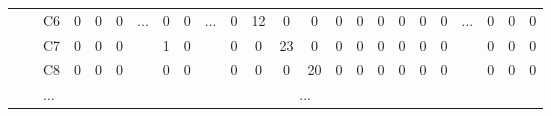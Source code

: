 \documentclass[12pt]{article}
\begin{document}
\begin{table}[!ht]
{\begin{tabular}{clcccccccccccccccccccccc}
								   & \multicolumn{1}{l|}{}                   & \multicolumn{1}{c|}{C6}   & \multicolumn{1}{c|}{0}    & \multicolumn{1}{c|}{0}    & \multicolumn{1}{c|}{0}    & \multicolumn{1}{c|}{\multirow{3}{*}{...}} & \multicolumn{1}{c|}{0}    & \multicolumn{1}{c|}{0}  & \multicolumn{1}{c|}{\multirow{3}{*}{...}} & \multicolumn{1}{c|}{0}  & \multicolumn{1}{c|}{12} & \multicolumn{1}{c|}{0}  & \multicolumn{1}{c|}{0}  & \multicolumn{1}{c|}{0}    & \multicolumn{1}{c|}{0}    & \multicolumn{1}{c|}{0}    & \multicolumn{1}{c|}{0}    & \multicolumn{1}{c|}{0}    & \multicolumn{1}{c|}{0}    & \multicolumn{1}{c|}{\multirow{3}{*}{...}} & \multicolumn{1}{c|}{0}  & \multicolumn{1}{c|}{0}  & \multicolumn{1}{c|}{0}  \\ \cline{3-6} \cline{8-9} \cline{11-20} \cline{22-24} 
								   & \multicolumn{1}{l|}{}                   & \multicolumn{1}{c|}{C7}   & \multicolumn{1}{c|}{0}    & \multicolumn{1}{c|}{0}    & \multicolumn{1}{c|}{0}    & \multicolumn{1}{c|}{}                     & \multicolumn{1}{c|}{1}    & \multicolumn{1}{c|}{0}  & \multicolumn{1}{c|}{}                     & \multicolumn{1}{c|}{0}  & \multicolumn{1}{c|}{0}  & \multicolumn{1}{c|}{23} & \multicolumn{1}{c|}{0}  & \multicolumn{1}{c|}{0}    & \multicolumn{1}{c|}{0}    & \multicolumn{1}{c|}{0}    & \multicolumn{1}{c|}{0}    & \multicolumn{1}{c|}{0}    & \multicolumn{1}{c|}{0}    & \multicolumn{1}{c|}{}                     & \multicolumn{1}{c|}{0}  & \multicolumn{1}{c|}{0}  & \multicolumn{1}{c|}{0}  \\ \cline{3-6} \cline{8-9} \cline{11-20} \cline{22-24} 
								   & \multicolumn{1}{l|}{}                   & \multicolumn{1}{c|}{C8}   & \multicolumn{1}{c|}{0}    & \multicolumn{1}{c|}{0}    & \multicolumn{1}{c|}{0}    & \multicolumn{1}{c|}{}                     & \multicolumn{1}{c|}{0}    & \multicolumn{1}{c|}{0}  & \multicolumn{1}{c|}{}                     & \multicolumn{1}{c|}{0}  & \multicolumn{1}{c|}{0}  & \multicolumn{1}{c|}{0}  & \multicolumn{1}{c|}{20} & \multicolumn{1}{c|}{0}    & \multicolumn{1}{c|}{0}    & \multicolumn{1}{c|}{0}    & \multicolumn{1}{c|}{0}    & \multicolumn{1}{c|}{0}    & \multicolumn{1}{c|}{0}    & \multicolumn{1}{c|}{}                     & \multicolumn{1}{c|}{0}  & \multicolumn{1}{c|}{0}  & \multicolumn{1}{c|}{0}  \\ \cline{3-6} \cline{8-9} \cline{11-20} \cline{22-24} 
								   & \multicolumn{1}{l|}{}                   & \multicolumn{1}{l|}{...}  & \multicolumn{21}{c|}{...}                                                                                                                                                                                                                                                                                                                                                                                                                                                                                                                                                                                                                 \\ \cline{3-6} \cline{8-9} \cline{11-20} \cline{22-24} 

\end{tabular}}
\end{table}
\end{document}
